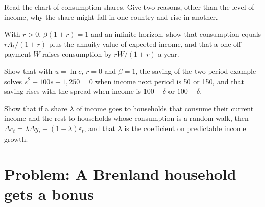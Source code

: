 \begin{exercise}[$\star\star$]\label{exo:b2:consumption:9}
Read the chart of consumption shares. Give two reasons, other than the level of income, why the share might fall in one
country and rise in another.
\end{exercise}

\begin{exercise}[$\star\star\star$]\label{exo:b2:consumption:10}
With $r > 0$, $\beta(1 + r) = 1$ and an infinite horizon, show that consumption equals $rA_t/(1 + r)$ plus the annuity value of expected income, and
that a one-off payment $W$ raises consumption by $rW/(1 + r)$ a year.
\end{exercise}

\begin{exercise}[$\star\star\star$]\label{exo:b2:consumption:11}
Show that with $u = \ln c$, $r = 0$ and $\beta = 1$, the saving of the two-period example solves $s^2 + 100s - 1{,}250 = 0$ when income next period is 50 or 150, and that
saving rises with the spread when income is $100 - \delta$ or $100 + \delta$.
\end{exercise}

\begin{exercise}[$\star\star\star$]\label{exo:b2:consumption:12}
Show that if a share $\lambda$ of income goes to households that consume their current income and the rest to households whose
consumption is a random walk, then $\Delta c_t = \lambda\Delta y_t + (1 - \lambda)\varepsilon_t$, and that $\lambda$ is the coefficient on predictable income growth.
\end{exercise}

\section{Problem: A Brenland household gets a bonus}\label{sec:b2:consumption:problem}

